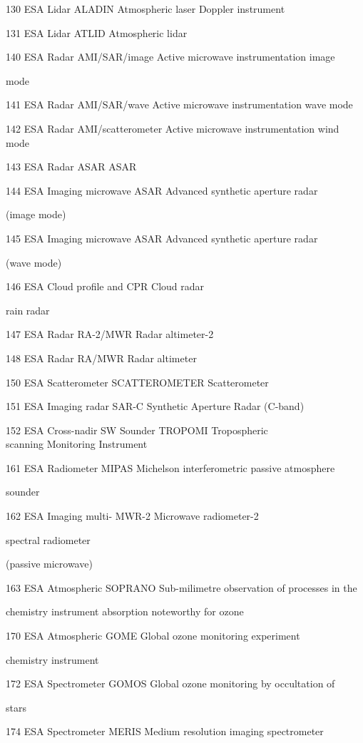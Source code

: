 130 ESA Lidar ALADIN Atmospheric laser Doppler instrument

131 ESA Lidar ATLID Atmospheric lidar

140 ESA Radar AMI/SAR/image Active microwave instrumentation image

mode

141 ESA Radar AMI/SAR/wave Active microwave instrumentation wave mode

142 ESA Radar AMI/scatterometer Active microwave instrumentation wind mode

143 ESA Radar ASAR ASAR

144 ESA Imaging microwave ASAR Advanced synthetic aperture radar

(image mode)

145 ESA Imaging microwave ASAR Advanced synthetic aperture radar

(wave mode)

146 ESA Cloud profile and CPR Cloud radar

rain radar

147 ESA Radar RA-2/MWR Radar altimeter-2

148 ESA Radar RA/MWR Radar altimeter

150 ESA Scatterometer SCATTEROMETER Scatterometer

151 ESA Imaging radar SAR-C Synthetic Aperture Radar (C-band)

152 ESA Cross-nadir SW Sounder TROPOMI Tropospheric\\
scanning Monitoring Instrument

161 ESA Radiometer MIPAS Michelson interferometric passive atmosphere

sounder

162 ESA Imaging multi- MWR-2 Microwave radiometer-2

spectral radiometer

(passive microwave)

163 ESA Atmospheric SOPRANO Sub-milimetre observation of processes in the

chemistry instrument absorption noteworthy for ozone

170 ESA Atmospheric GOME Global ozone monitoring experiment

chemistry instrument

172 ESA Spectrometer GOMOS Global ozone monitoring by occultation of

stars

174 ESA Spectrometer MERIS Medium resolution imaging spectrometer

